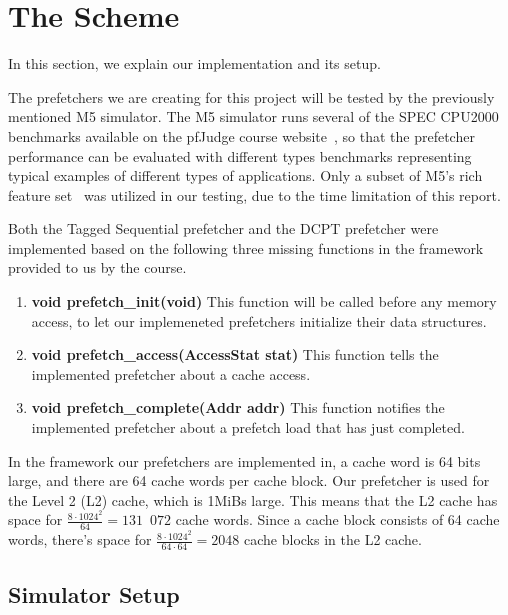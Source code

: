 \section{The Scheme}

In this section, we explain our implementation and its setup.

The prefetchers we are creating for this project will be tested by the
previously mentioned M5 simulator. The M5 simulator runs several of the SPEC
CPU2000 benchmarks available on the pfJudge course website~\cite{guidelines}, so
that the prefetcher performance can be evaluated with different types benchmarks
representing typical examples of different types of applications. Only a subset
of M5's rich feature set~\cite[Ch.~2]{user_doc} was utilized in our testing,
due to the time limitation of this report.

Both the Tagged Sequential prefetcher and the DCPT prefetcher were implemented
based on the following three missing functions in the framework provided to us
by the course\cite[Ch.~3]{user_doc}.
\begin{enumerate}
	\item \textbf{void prefetch\_init(void)}
		This function will be called before any memory access, to let our
		implemeneted prefetchers initialize their data structures.
	\item \textbf{void prefetch\_access(AccessStat stat)}
		This function tells the implemented prefetcher about a cache access.
	\item \textbf{void prefetch\_complete(Addr addr)}
		This function notifies the implemented prefetcher about a prefetch load
		that has just completed.
\end{enumerate}

In the framework our prefetchers are implemented in, a cache word is 64 bits
large, and there are 64 cache words per cache block. Our prefetcher is used for
the Level 2 (L2) cache, which is 1MiBs large. This means that the L2 cache has
space for $\frac{8 \cdot 1024^{2}}{64} = 131$~$072$ cache words. Since a cache
block consists of 64 cache words, there's space for $\frac{8 \cdot 1024^{2}}{64
\cdot 64} = 2048$ cache blocks in the L2 cache.

\subsection{Simulator Setup}



